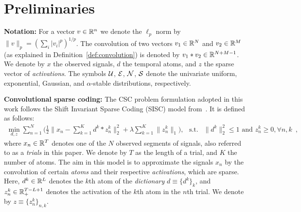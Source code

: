 




\section{Preliminaries}


\textbf{Notation:} For a vector $v \in \mathbb{R}^n$ we denote the $\ell_p$ norm by $\|v\|_p = \left(\sum_i |v_i|^p \right)^{1/p}$. The convolution of two vectors $v_1 \in \mathbb{R}^N$ and $v_2 \in \mathbb{R}^M$ (as explained in Definition~\ref{def:convolution}) is denoted by $v_1 \ast v_2 \in \mathbb{R}^{N + M - 1}$. We denote by $x$ the observed signals, $d$ the temporal atoms, and $z$ the sparse vector of \emph{activations}. The symbols ${\cal U}$, ${\cal E}$, ${\cal N}$, ${\cal S}$ denote the univariate uniform, exponential, Gaussian, and $\alpha$-stable distributions, respectively.

\textbf{Convolutional sparse coding:} 
The CSC problem formulation adopted in this work follows the Shift Invariant Sparse Coding (SISC) model from~\cite{Grosse-etal:2007}. It is defined as follows:
%
\begin{align}
 \min_{d, z} \sum_{n=1}^{N} \Big( \frac{1}{2}\|x_{n} - \sum_{k=1}^{K}d^{k} * z_{n}^{k}\|_{2}^{2} + \lambda \sum_{k=1}^K \|z_{n}^{k}\|_1 \Big), \hspace{9pt}
 \text{s.t. } \>\> \|d^{k}\|_2^2 \leq 1 \text{  and } z_n^k \geq 0, \forall n, k
\label{eq:problem_definition} \enspace ,
\end{align}
%
where $x_{n} \in \mathbb{R}^{T}$ denotes one of the $N$ observed segments of signals, also referred to as a \emph{trials} in this paper. We denote by $T$ as the length of a trial, and $K$ the number of atoms. The aim in this model is to approximate the signals $x_n$ by the convolution of certain \emph{atoms} and their respective \emph{activations}, which are sparse. Here, $d^{k} \in \mathbb{R}^{L}$ denotes the $k$th atom of the \emph{dictionary} $d \equiv \{d^k\}_{k}$, and $z_{n}^{k} \in \mathbb{R}_+^{T-L+1}$ denotes the activation of the $k$th atom in the $n$th trial. We denote by $z \equiv \{z_n^k\}_{n,k}$.

